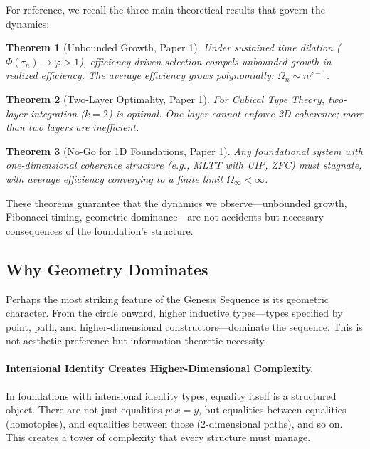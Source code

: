 \documentclass[11pt]{article}
\newtheorem{theorem}{Theorem}[section]
\theoremstyle{definition}
\begin{document}
For reference, we recall the three main theoretical results that govern the dynamics:

\begin{theorem}[Unbounded Growth, Paper 1]
\label{thm:unbounded-recap}
Under sustained time dilation ($\Phi(\tau_n) \to \varphi > 1$), efficiency-driven selection compels unbounded growth in realized efficiency. The average efficiency grows polynomially: $\Omega_n \sim n^{\varphi-1}$.
\end{theorem}

\begin{theorem}[Two-Layer Optimality, Paper 1]
\label{thm:k2-recap}
For Cubical Type Theory, two-layer integration ($k=2$) is optimal. One layer cannot enforce 2D coherence; more than two layers are inefficient.
\end{theorem}

\begin{theorem}[No-Go for 1D Foundations, Paper 1]
\label{thm:nogo-recap}
Any foundational system with one-dimensional coherence structure (e.g., MLTT with UIP, ZFC) must stagnate, with average efficiency converging to a finite limit $\Omega_\infty < \infty$.
\end{theorem}

These theorems guarantee that the dynamics we observe—unbounded growth, Fibonacci timing, geometric dominance—are not accidents but necessary consequences of the foundation's structure.

\subsection{Why Geometry Dominates}

Perhaps the most striking feature of the Genesis Sequence is its geometric character. From the circle onward, higher inductive types—types specified by point, path, and higher-dimensional constructors—dominate the sequence. This is not aesthetic preference but information-theoretic necessity.

\paragraph{Intensional Identity Creates Higher-Dimensional Complexity.}

In foundations with intensional identity types, equality itself is a structured object. There are not just equalities $p : x = y$, but equalities between equalities (homotopies), and equalities between those (2-dimensional paths), and so on. This creates a tower of complexity that every structure must manage.
\end{document}
